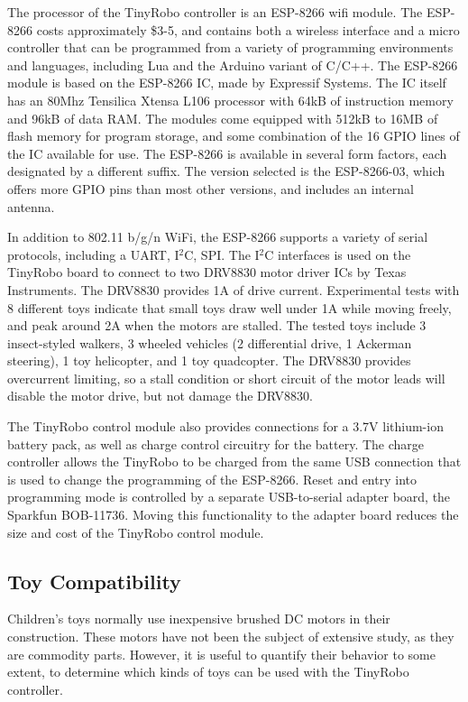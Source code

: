 \documentclass[]{article}
\begin{document}
The processor of the TinyRobo controller is an ESP-8266 wifi module.
The ESP-8266 costs approximately \$3-5, and contains both a wireless interface and a micro controller that can be programmed from a variety of programming environments and languages, including Lua and the Arduino variant of C/C++. The ESP-8266 module is based on the ESP-8266 IC, made by Expressif Systems. The IC itself has an 80Mhz Tensilica Xtensa L106 processor with 64kB of instruction memory and 96kB of data RAM. The modules come equipped with 512kB to 16MB of flash memory for program storage, and some combination of the 16 GPIO lines of the IC available for use. 
The ESP-8266 is available in several form factors, each designated by a different suffix. 
The version selected is the ESP-8266-03, which offers more GPIO pins than most other versions, and includes an internal antenna.

In addition to 802.11 b/g/n WiFi, the ESP-8266 supports a variety of serial protocols, including a UART, I$^2$C, SPI. 
The I$^2$C interfaces is used on the TinyRobo board to connect to two DRV8830 motor driver ICs by Texas Instruments. 
The DRV8830 provides 1A of drive current.
Experimental tests with 8 different toys indicate that small toys draw well under 1A while moving freely, and peak around 2A when the motors are stalled. 
The tested toys include 3 insect-styled walkers, 3 wheeled vehicles (2 differential drive, 1 Ackerman steering), 1 toy helicopter, and 1 toy quadcopter.
The DRV8830 provides overcurrent limiting, so a stall condition or short circuit of the motor leads will disable the motor drive, but not damage the DRV8830. 


The TinyRobo control module also provides connections for a 3.7V lithium-ion battery pack, as well as charge control circuitry for the battery. 
The charge controller allows the TinyRobo to be charged from the same USB connection that is used to change the programming of the ESP-8266. 
Reset and entry into programming mode is controlled by a separate USB-to-serial adapter board, the Sparkfun BOB-11736.
Moving this functionality to the adapter board reduces the size and cost of the TinyRobo control module. 

\subsection{Toy Compatibility}

Children's toys normally use inexpensive brushed DC motors in their construction. 
These motors have not been the subject of extensive study, as they are commodity parts. 
However, it is useful to quantify their behavior to some extent, to determine which kinds of toys can be used with the TinyRobo controller. 
\end{document}
